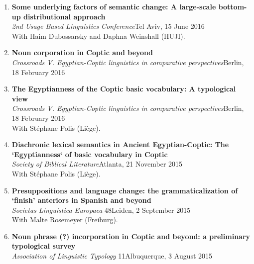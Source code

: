 \documentclass[letterpaper,11pt]{article}
\begin{document}
\begin{enumerate}
\item \textbf{Some underlying factors of semantic change: A large-scale bottom-up distributional approach}\\ 
\textit{2nd Usage Based Linguistics Conference}\hfill{Tel Aviv, 15 June 2016}\\
With Haim Dubossarsky and Daphna Weinshall (HUJI).

\item \textbf{Noun corporation in Coptic and beyond}\\
\textit{Crossroads V. Egyptian-Coptic linguistics in comparative perspectives}\hfill{Berlin, 18 February 2016}

\item \textbf{The Egyptianness of the Coptic basic vocabulary: A typological view}\\
\textit{Crossroads V. Egyptian-Coptic linguistics in comparative perspectives}\hfill{Berlin, 18 February 2016}\\
With St\'{e}phane Polis (Li\`{e}ge).

\item \textbf{Diachronic lexical semantics in Ancient Egyptian-Coptic: The `Egyptianness` of basic vocabulary in Coptic}\\\textit{Society of Biblical Literature}\hfill{Atlanta, 21 November 2015}\\With St\'{e}phane Polis (Li\`{e}ge).

\item \textbf{Presuppositions and language change: the grammaticalization of `finish' anteriors in Spanish and beyond}\\ \textit{Societas Linguistica Europaea} 48\hfill{Leiden, 2 September 2015}\\With Malte Rosemeyer (Freiburg).

\item \textbf{Noun phrase (?) incorporation in Coptic and beyond: a preliminary typological survey}\\\textit{Association of Linguistic Typology} 11\hfill{Albuquerque, 3 August 2015}\\ 


\end{enumerate}
\end{document}
